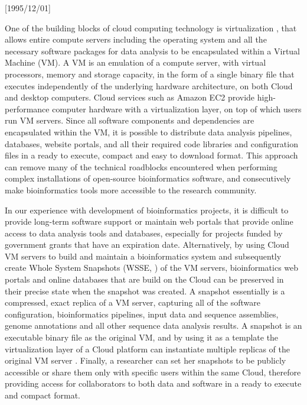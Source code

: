 \NeedsTeXFormat{LaTeX2e}[1995/12/01] \documentclass[10pt]{bmc_article}
\newenvironment{bmcformat}{\begin{raggedright}\baselineskip20pt\sloppy\setboolean{publ}{false}}{\end{raggedright}\baselineskip20pt\sloppy}
\begin{document}
\begin{bmcformat}
One of the building blocks of cloud computing technology is virtualization \cite{Uhlig2005}, that allows entire 
compute servers including the operating system and all the necessary software packages for data analysis 
to be encapsulated within a Virtual Machine (VM). A VM is an emulation of a compute server, with virtual 
processors, memory and storage capacity, in the form of a single binary file that executes 
independently of the underlying hardware architecture, on both Cloud and desktop computers. 
Cloud services such as Amazon EC2 \cite{awsec2} provide high-performance computer hardware with a 
virtualization layer, on top of which users run VM servers. Since all software components and dependencies 
are  encapsulated  within the VM, it is possible to  distribute data analysis pipelines, databases, website portals, 
and all their required code libraries and configuration files in a ready to execute, compact and easy to 
download format.  This approach can remove many of the technical roadblocks encountered when 
performing  complex installations of open-source bioinformatics software, and consecutively make bioinformatics 
tools more accessible to the research community. \pb

In our experience with development of bioinformatics projects, it is difficult to provide long-term software
support or maintain web portals that provide online access to data analysis tools and databases, especially 
for projects funded by government grants that have an expiration date. Alternatively, by using Cloud VM servers
to build and maintain a bioinformatics system and subsequently create Whole System Snapshots (WSSE,
\cite{Dudley2010, Krampis2012}) of the VM servers, bioinformatics web portals and online databases that 
are build on the Cloud can be  preserved in their precise state when the snapshot was created. A snapshot 
essentially is a compressed,  exact replica of a VM server, capturing all of the software configuration, bioinformatics
pipelines, input data and sequence assemblies, genome annotations and all other sequence data analysis results. 
A snapshot is an executable binary file as the original VM, and by using it as a template the 
virtualization layer of a Cloud platform can instantiate multiple replicas of the original VM server \cite{ebs}. 
Finally, a researcher can set her snapshots to be publicly  accessible or share them only with specific users 
within the same Cloud, therefore providing access for collaborators to both data and software in a ready to execute 
and compact format. \pb


\end{bmcformat}
\end{document}
